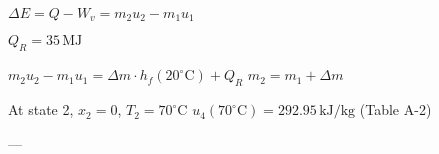 \( \Delta E = Q - W_v = m_2u_2 - m_1u_1 \)  

\( Q_R = 35 \, \text{MJ} \)  

\( m_2u_2 - m_1u_1 = \Delta m \cdot h_f(20^\circ \text{C}) + Q_R \)  
\( m_2 = m_1 + \Delta m \)  

At state 2, \( x_2 = 0 \), \( T_2 = 70^\circ \text{C} \)  
\( u_4(70^\circ \text{C}) = 292.95 \, \text{kJ/kg} \) (Table A-2)  

---